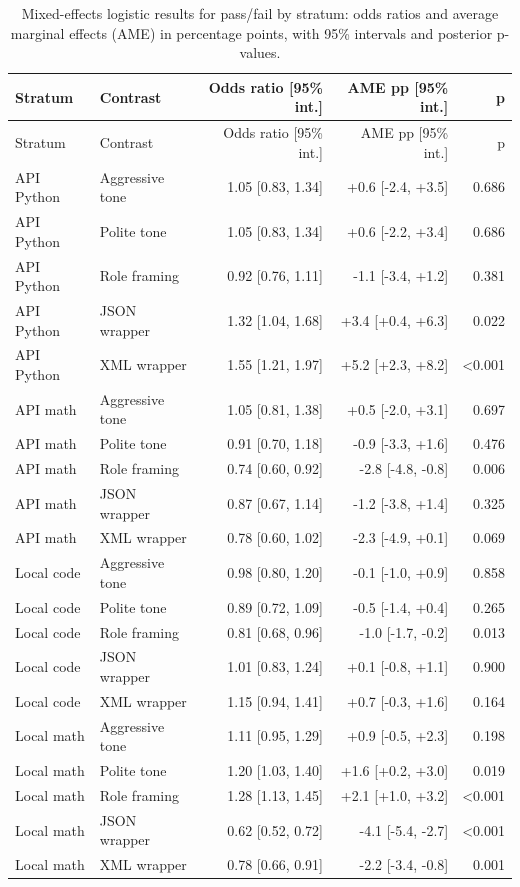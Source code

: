 \documentclass[a4paper,fleqn]{cas-sc}
\begin{document}
\begin{longtable}[]{@{}llrrr@{}}
\caption{Mixed-effects logistic results for pass/fail by stratum: odds ratios and average marginal effects (AME) in percentage points, with 95\% intervals and posterior p-values.}\label{tab:mixed-effects-pass}\tabularnewline
\toprule\noalign{}
Stratum & Contrast & Odds ratio [95\% int.] & AME pp [95\% int.] & p \\
\midrule\noalign{}
\endfirsthead
\toprule\noalign{}
Stratum & Contrast & Odds ratio [95\% int.] & AME pp [95\% int.] & p \\
\midrule\noalign{}
\endhead
\bottomrule\noalign{}
\endlastfoot
API Python & Aggressive tone & 1.05 [0.83, 1.34] & +0.6 [-2.4, +3.5] & 0.686 \\
API Python & Polite tone & 1.05 [0.83, 1.34] & +0.6 [-2.2, +3.4] & 0.686 \\
API Python & Role framing & 0.92 [0.76, 1.11] & -1.1 [-3.4, +1.2] & 0.381 \\
API Python & JSON wrapper & 1.32 [1.04, 1.68] & +3.4 [+0.4, +6.3] & 0.022 \\
API Python & XML wrapper & 1.55 [1.21, 1.97] & +5.2 [+2.3, +8.2] & \textless{}0.001 \\
API math & Aggressive tone & 1.05 [0.81, 1.38] & +0.5 [-2.0, +3.1] & 0.697 \\
API math & Polite tone & 0.91 [0.70, 1.18] & -0.9 [-3.3, +1.6] & 0.476 \\
API math & Role framing & 0.74 [0.60, 0.92] & -2.8 [-4.8, -0.8] & 0.006 \\
API math & JSON wrapper & 0.87 [0.67, 1.14] & -1.2 [-3.8, +1.4] & 0.325 \\
API math & XML wrapper & 0.78 [0.60, 1.02] & -2.3 [-4.9, +0.1] & 0.069 \\
Local code & Aggressive tone & 0.98 [0.80, 1.20] & -0.1 [-1.0, +0.9] & 0.858 \\
Local code & Polite tone & 0.89 [0.72, 1.09] & -0.5 [-1.4, +0.4] & 0.265 \\
Local code & Role framing & 0.81 [0.68, 0.96] & -1.0 [-1.7, -0.2] & 0.013 \\
Local code & JSON wrapper & 1.01 [0.83, 1.24] & +0.1 [-0.8, +1.1] & 0.900 \\
Local code & XML wrapper & 1.15 [0.94, 1.41] & +0.7 [-0.3, +1.6] & 0.164 \\
Local math & Aggressive tone & 1.11 [0.95, 1.29] & +0.9 [-0.5, +2.3] & 0.198 \\
Local math & Polite tone & 1.20 [1.03, 1.40] & +1.6 [+0.2, +3.0] & 0.019 \\
Local math & Role framing & 1.28 [1.13, 1.45] & +2.1 [+1.0, +3.2] & \textless{}0.001 \\
Local math & JSON wrapper & 0.62 [0.52, 0.72] & -4.1 [-5.4, -2.7] & \textless{}0.001 \\
Local math & XML wrapper & 0.78 [0.66, 0.91] & -2.2 [-3.4, -0.8] & 0.001 \\
\end{longtable}
\end{document}
